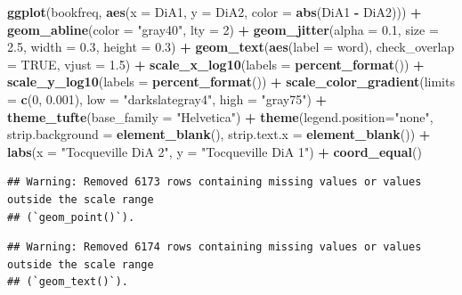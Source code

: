 \documentclass[
]{article}
\newenvironment{Shaded}{\begin{snugshade}}{\end{snugshade}}
\newcommand{\AttributeTok}[1]{\textcolor[rgb]{0.13,0.29,0.53}{#1}}
\newcommand{\ConstantTok}[1]{\textcolor[rgb]{0.56,0.35,0.01}{#1}}
\newcommand{\DecValTok}[1]{\textcolor[rgb]{0.00,0.00,0.81}{#1}}
\newcommand{\FloatTok}[1]{\textcolor[rgb]{0.00,0.00,0.81}{#1}}
\newcommand{\FunctionTok}[1]{\textcolor[rgb]{0.13,0.29,0.53}{\textbf{#1}}}
\newcommand{\NormalTok}[1]{#1}
\newcommand{\SpecialCharTok}[1]{\textcolor[rgb]{0.81,0.36,0.00}{\textbf{#1}}}
\newcommand{\StringTok}[1]{\textcolor[rgb]{0.31,0.60,0.02}{#1}}
\begin{document}
\begin{Shaded}
\begin{Highlighting}[]
\FunctionTok{ggplot}\NormalTok{(bookfreq, }\FunctionTok{aes}\NormalTok{(}\AttributeTok{x =}\NormalTok{ DiA1, }\AttributeTok{y =}\NormalTok{ DiA2, }\AttributeTok{color =} \FunctionTok{abs}\NormalTok{(DiA1 }\SpecialCharTok{{-}}\NormalTok{ DiA2))) }\SpecialCharTok{+}
  \FunctionTok{geom\_abline}\NormalTok{(}\AttributeTok{color =} \StringTok{"gray40"}\NormalTok{, }\AttributeTok{lty =} \DecValTok{2}\NormalTok{) }\SpecialCharTok{+}
  \FunctionTok{geom\_jitter}\NormalTok{(}\AttributeTok{alpha =} \FloatTok{0.1}\NormalTok{, }\AttributeTok{size =} \FloatTok{2.5}\NormalTok{, }\AttributeTok{width =} \FloatTok{0.3}\NormalTok{, }\AttributeTok{height =} \FloatTok{0.3}\NormalTok{) }\SpecialCharTok{+}
  \FunctionTok{geom\_text}\NormalTok{(}\FunctionTok{aes}\NormalTok{(}\AttributeTok{label =}\NormalTok{ word), }\AttributeTok{check\_overlap =} \ConstantTok{TRUE}\NormalTok{, }\AttributeTok{vjust =} \FloatTok{1.5}\NormalTok{) }\SpecialCharTok{+}
  \FunctionTok{scale\_x\_log10}\NormalTok{(}\AttributeTok{labels =} \FunctionTok{percent\_format}\NormalTok{()) }\SpecialCharTok{+}
  \FunctionTok{scale\_y\_log10}\NormalTok{(}\AttributeTok{labels =} \FunctionTok{percent\_format}\NormalTok{()) }\SpecialCharTok{+}
  \FunctionTok{scale\_color\_gradient}\NormalTok{(}\AttributeTok{limits =} \FunctionTok{c}\NormalTok{(}\DecValTok{0}\NormalTok{, }\FloatTok{0.001}\NormalTok{), }\AttributeTok{low =} \StringTok{"darkslategray4"}\NormalTok{, }\AttributeTok{high =} \StringTok{"gray75"}\NormalTok{) }\SpecialCharTok{+}
  \FunctionTok{theme\_tufte}\NormalTok{(}\AttributeTok{base\_family =} \StringTok{"Helvetica"}\NormalTok{) }\SpecialCharTok{+}
  \FunctionTok{theme}\NormalTok{(}\AttributeTok{legend.position=}\StringTok{"none"}\NormalTok{, }
        \AttributeTok{strip.background =} \FunctionTok{element\_blank}\NormalTok{(), }
        \AttributeTok{strip.text.x =} \FunctionTok{element\_blank}\NormalTok{()) }\SpecialCharTok{+}
  \FunctionTok{labs}\NormalTok{(}\AttributeTok{x =} \StringTok{"Tocqueville DiA 2"}\NormalTok{, }\AttributeTok{y =} \StringTok{"Tocqueville DiA 1"}\NormalTok{) }\SpecialCharTok{+}
  \FunctionTok{coord\_equal}\NormalTok{()}
\end{Highlighting}
\end{Shaded}

\begin{verbatim}
## Warning: Removed 6173 rows containing missing values or values outside the scale range
## (`geom_point()`).
\end{verbatim}

\begin{verbatim}
## Warning: Removed 6174 rows containing missing values or values outside the scale range
## (`geom_text()`).
\end{verbatim}
\end{document}

